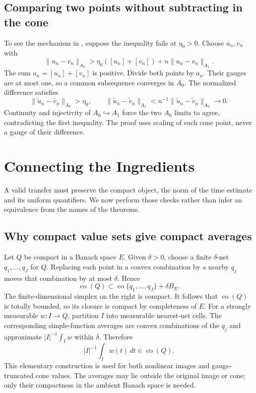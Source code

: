 \documentclass[12pt,reqno]{amsart}
\begin{document}
\subsection{Comparing two points without subtracting in the cone}
\begin{lemma}\label{lem:ehrling}

\end{lemma}
To see the mechanism in \cite[Lemma 1, pp.~4--5]{S-barrett-suli}, suppose the inequality fails at $\eta_0>0$. Choose $u_n,v_n$ with
\[
\|u_n-v_n\|_{A_0}>\eta_0([u_n]+[v_n])+n\|u_n-v_n\|_{A_1}.
\]
The sum $a_n=[u_n]+[v_n]$ is positive. Divide both points by $a_n$. Their gauges are at most one, so a common subsequence converges in $A_0$. The normalized difference satisfies
\[
\|\widetilde u_n-\widetilde v_n\|_{A_0}>\eta_0,
\qquad
\|\widetilde u_n-\widetilde v_n\|_{A_1}
< n^{-1}\|\widetilde u_n-\widetilde v_n\|_{A_0}\longrightarrow0.
\]
Continuity and injectivity of $A_0\hookrightarrow A_1$ force the two $A_0$ limits to agree, contradicting the first inequality. The proof uses scaling of each cone point, never a gauge of their difference.
\section{Connecting the Ingredients}
A valid transfer must preserve the compact object, the norm of the time estimate and its uniform quantifiers. We now perform those checks rather than infer an equivalence from the names of the theorems.
\subsection{Why compact value sets give compact averages}
Let $Q$ be compact in a Banach space $E$. Given $\delta>0$, choose a finite $\delta$-net $q_1,\ldots,q_J$ for $Q$. Replacing each point in a convex combination by a nearby $q_j$ moves that combination by at most $\delta$. Hence
\[
\operatorname{co}(Q)\subset \operatorname{co}\{q_1,\ldots,q_J\}+\delta B_E.
\]
The finite-dimensional simplex on the right is compact. It follows that $\operatorname{co}(Q)$ is totally bounded, so its closure is compact by completeness of $E$.
For a strongly measurable $w:I\to Q$, partition $I$ into measurable nearest-net cells. The corresponding simple-function averages are convex combinations of the $q_j$ and approximate $|I|^{-1}\int_Iw$ within $\delta$. Therefore
\[
|I|^{-1}\int_I w(t)\,dt\in\overline{\operatorname{co}}(Q).
\]
This elementary construction is used for both nonlinear images and gauge-truncated cone values. The averages may lie outside the original image or cone; only their compactness in the ambient Banach space is needed.
\end{document}
